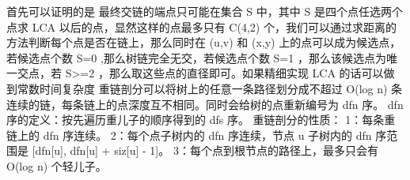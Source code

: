 {}首先可以证明的是 最终交链的端点只可能在集合\markdownRendererDollarSign{} S \markdownRendererDollarSign{}中，其中\markdownRendererDollarSign{} S \markdownRendererDollarSign{}是四个点任选两个点求\markdownRendererDollarSign{} LCA \markdownRendererDollarSign{}以后的点，显然这样的点最多只有\markdownRendererDollarSign{} C(4,2) \markdownRendererDollarSign{}个，我们可以通过求距离的方法判断每个点是否在链上，那么同时在\markdownRendererDollarSign{} (u,v) \markdownRendererDollarSign{}和\markdownRendererDollarSign{} (x,y) \markdownRendererDollarSign{}上的点可以成为候选点，若候选点个数\markdownRendererDollarSign{} \markdownRendererPipe{}S\markdownRendererPipe{}=0 \markdownRendererDollarSign{},那么树链完全无交，若候选点个数\markdownRendererDollarSign{} \markdownRendererPipe{}S\markdownRendererPipe{}=1 \markdownRendererDollarSign{}，那么该候选点为唯一交点，若\markdownRendererDollarSign{} \markdownRendererPipe{}S\markdownRendererPipe{}>=2 \markdownRendererDollarSign{}，那么取这些点的直径即可。如果精细实现\markdownRendererDollarSign{} LCA \markdownRendererDollarSign{}的话可以做到常数时间复杂度\markdownRendererInterblockSeparator
{}\markdownRendererInterblockSeparator
{}
\markdownRendererSectionEnd \markdownRendererSectionBegin
{}\markdownRendererInterblockSeparator
{}重链剖分可以将树上的任意一条路径划分成不超过 \markdownRendererDollarSign{}O(\markdownRendererBackslash{}log n)\markdownRendererDollarSign{} 条连续的链，每条链上的点深度互不相同。同时会给树的点重新编号为 \markdownRendererDollarSign{}dfn\markdownRendererDollarSign{} 序。\markdownRendererParagraphSeparator
{}\markdownRendererDollarSign{}dfn\markdownRendererDollarSign{} 序的定义：按先遍历重儿子的顺序得到的 \markdownRendererDollarSign{}dfs\markdownRendererDollarSign{} 序。\markdownRendererParagraphSeparator
{}重链剖分的性质：\markdownRendererParagraphSeparator
{}1：每条重链上的 \markdownRendererDollarSign{}dfn\markdownRendererDollarSign{} 序连续。\markdownRendererHardLineBreak
{}2：每个点子树内的 \markdownRendererDollarSign{}dfn\markdownRendererDollarSign{} 序连续，节点 \markdownRendererDollarSign{}u\markdownRendererDollarSign{} 子树内的 \markdownRendererDollarSign{}dfn\markdownRendererDollarSign{} 序范围是 \markdownRendererDollarSign{}[dfn[u], dfn[u] + siz[u] - 1]\markdownRendererDollarSign{}。\markdownRendererHardLineBreak
{}3：每个点到根节点的路径上，最多只会有 \markdownRendererDollarSign{}O(\markdownRendererBackslash{}log n)\markdownRendererDollarSign{} 个轻儿子。\markdownRendererHardLineBreak

